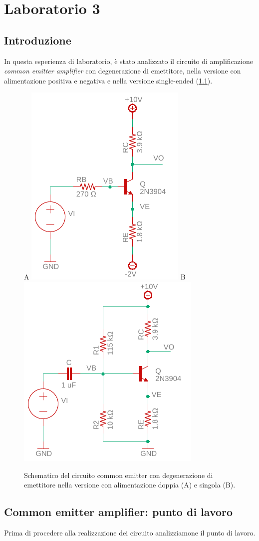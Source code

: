 \chapter{Laboratorio 3}
\section{Introduzione}
In questa esperienza di laboratorio, è stato analizzato il circuito di amplificazione \textit{common emitter amplifier} con degenerazione di emettitore, nella versione con alimentazione positiva e negativa e nella versione single-ended (\Fig\ref{fig:commonemitter}).
\begin{figure}[h!]
	\centering
	A
	\includegraphics[width=0.4\linewidth]{./OtherFiles/Laboratorio 3/common emitter}
	B
	\includegraphics[width=0.4\linewidth]{./OtherFiles/Laboratorio 3/common emitter_se}
	\caption{Schematico del circuito common emitter con degenerazione di emettitore nella versione con alimentazione doppia (A) e singola (B).}
	\label{fig:commonemitter}
\end{figure}

\section{Common emitter amplifier: punto di lavoro}
Prima di procedere alla realizzazione dei circuito analizziamone il punto di lavoro.

